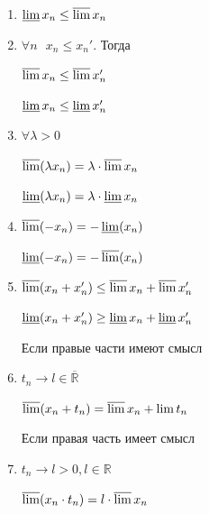 \documentclass{article}
\begin{document}
            \begin{enumerate}
            
                \item $\varliminf x_n \leq \varlimsup x_n$
                
                \item $\forall n \ \ \ x_n \leq x_n'$. Тогда
                
                    $\varlimsup x_n \leq \varlimsup x_n'$
                    
                    $\varliminf x_n \leq \varliminf x_n'$
                    
                \item $\forall \lambda > 0$
                
                    $\varlimsup(\lambda x_n) = \lambda \cdot \varlimsup x_n$
                    
                    $\varliminf(\lambda x_n) = \lambda \cdot \varliminf x_n$
                    
                \item $\varlimsup (-x_n) = -\varliminf(x_n)$
                
                    $\varliminf (-x_n) = -\varlimsup(x_n)$
                    
                \item $\varlimsup (x_n + x_n') \leq \varlimsup x_n + \varlimsup x_n'$
                    
                    $\varliminf (x_n + x_n') \geq \varliminf x_n + \varliminf x_n'$
                    
                    Если правые части имеют смысл
                    
                \item $t_n \rightarrow l \in \overline{\mathbb{R}}$ 
                
                    $\varlimsup (x_n + t_n) = \varlimsup x_n + \lim t_n$
                
                    Если правая часть имеет смысл
                    
                \item $t_n \rightarrow l > 0, l \in \mathbb{R}$ 
                
                    $\varlimsup(x_n \cdot t_n) = l \cdot \varlimsup x_n$
                
            \end{enumerate}
            
\end{document}
